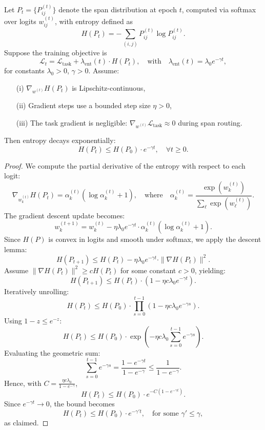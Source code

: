 \begin{proposition}
\label{prop:entropy_decay}
Let \( P_t = \{P_{ij}^{(t)}\} \) denote the span distribution at epoch \(t\), computed via softmax over logits \(w_{ij}^{(t)}\), with entropy defined as
\[
H(P_t) = -\sum_{(i,j)} P_{ij}^{(t)} \log P_{ij}^{(t)}.
\]
Suppose the training objective is
\[
\mathcal{L}_t = \mathcal{L}_{\text{task}} + \lambda_{\mathrm{ent}}(t) \cdot H(P_t), \quad \text{with} \quad \lambda_{\mathrm{ent}}(t) = \lambda_0 e^{-\gamma t},
\]
for constants \(\lambda_0 > 0\), \(\gamma > 0\). Assume:
\begin{itemize}
    \item[(i)] \(\nabla_{w^{(t)}} H(P_t)\) is Lipschitz-continuous,
    \item[(ii)] Gradient steps use a bounded step size \(\eta > 0\),
    \item[(iii)] The task gradient is negligible: \(\nabla_{w^{(t)}} \mathcal{L}_{\text{task}} \approx 0\) during span routing.
\end{itemize}
Then entropy decays exponentially:
\[
H(P_t) \leq H(P_0) \cdot e^{-\gamma t}, \quad \forall t \geq 0.
\]
\end{proposition}

\begin{proof}
We compute the partial derivative of the entropy with respect to each logit:
\[
\nabla_{w_k^{(t)}} H(P_t) = \alpha_k^{(t)} \left( \log \alpha_k^{(t)} + 1 \right), \quad \text{where} \quad \alpha_k^{(t)} = \frac{\exp(w_k^{(t)})}{\sum_\ell \exp(w_\ell^{(t)})}.
\]
The gradient descent update becomes:
\[
w_k^{(t+1)} = w_k^{(t)} - \eta \lambda_0 e^{-\gamma t} \cdot \alpha_k^{(t)} (\log \alpha_k^{(t)} + 1).
\]
Since \(H(P)\) is convex in logits and smooth under softmax, we apply the descent lemma:
\[
H(P_{t+1}) \leq H(P_t) - \eta \lambda_0 e^{-\gamma t} \cdot \| \nabla H(P_t) \|^2.
\]
Assume \(\| \nabla H(P_t) \|^2 \geq c H(P_t)\) for some constant \(c > 0\), yielding:
\[
H(P_{t+1}) \leq H(P_t) \cdot (1 - \eta c \lambda_0 e^{-\gamma t}).
\]
Iteratively unrolling:
\[
H(P_t) \leq H(P_0) \cdot \prod_{s=0}^{t-1} (1 - \eta c \lambda_0 e^{-\gamma s}).
\]
Using \(1 - z \leq e^{-z}\):
\[
H(P_t) \leq H(P_0) \cdot \exp\left(-\eta c \lambda_0 \sum_{s=0}^{t-1} e^{-\gamma s} \right).
\]
Evaluating the geometric sum:
\[
\sum_{s=0}^{t-1} e^{-\gamma s} = \frac{1 - e^{-\gamma t}}{1 - e^{-\gamma}} \leq \frac{1}{1 - e^{-\gamma}}.
\]
Hence, with \(C = \frac{\eta c \lambda_0}{1 - e^{-\gamma}}\),
\[
H(P_t) \leq H(P_0) \cdot e^{-C (1 - e^{-\gamma t})}.
\]
Since \(e^{-\gamma t} \to 0\), the bound becomes
\[
H(P_t) \leq H(P_0) \cdot e^{-\gamma' t}, \quad \text{for some } \gamma' \leq \gamma,
\]
as claimed.
\end{proof}

